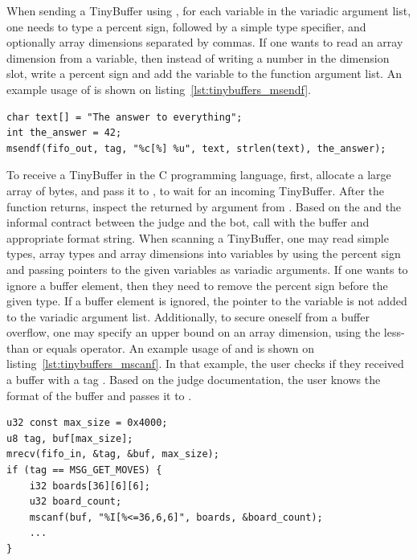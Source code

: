 When sending a TinyBuffer using , for each variable in the variadic argument list, one needs to type a percent sign, followed by a simple type specifier, and optionally array dimensions separated by commas. If one wants to read an array dimension from a variable, then instead of writing a number in the dimension slot, write a percent sign and add the variable to the function argument list. An example usage of  is shown on listing~\ref{lst:tinybuffers_msendf}.

\begin{lstlisting}[caption={Sending a string and a number in C.},label={lst:tinybuffers_msendf}]
char text[] = "The answer to everything";
int the_answer = 42;
msendf(fifo_out, tag, "%c[%] %u", text, strlen(text), the_answer);
\end{lstlisting}

To receive a TinyBuffer in the C programming language, first, allocate a large array of bytes, and pass it to , to wait for an incoming TinyBuffer. After the function returns, inspect the  returned by argument from . Based on the  and the informal contract between the judge and the bot, call  with the buffer and appropriate format string. When scanning a TinyBuffer, one may read simple types, array types and array dimensions into variables by using the percent sign and passing pointers to the given variables as variadic arguments. If one wants to ignore a buffer element, then they need to remove the percent sign before the given type. If a buffer element is ignored, the pointer to the variable is not added to the variadic argument list. Additionally, to secure oneself from a buffer overflow, one may specify an upper bound on an array dimension, using the less-than or equals operator. An example usage of  and  is shown on listing~\ref{lst:tinybuffers_mscanf}. In that example, the user checks if they received a buffer with a tag . Based on the judge documentation, the user knows the format of the buffer and passes it to .

\begin{lstlisting}[caption={Receiving an array of 36 or less $6 \times 6$ Pentago boards in C},label={lst:tinybuffers_mscanf}]
u32 const max_size = 0x4000;
u8 tag, buf[max_size];
mrecv(fifo_in, &tag, &buf, max_size);
if (tag == MSG_GET_MOVES) {
    i32 boards[36][6][6];
    u32 board_count;
    mscanf(buf, "%I[%<=36,6,6]", boards, &board_count);
    ...
}
\end{lstlisting}



